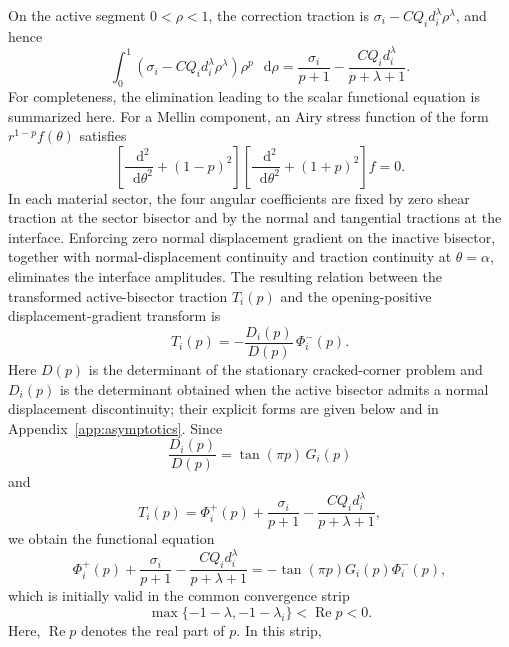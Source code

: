 \documentclass[pdflatex,onecolumn,sn-mathphys-ay]{sn-jnl}
\newcommand{\dd}{\mathop{}\!\mathrm{d}}
\begin{document}
On the active segment $0<\rho<1$, the correction traction is
$\sigma_i-CQ_i d_i^\lambda\rho^\lambda$, and hence
\begin{equation*}
  \int_0^1
  \left(\sigma_i-CQ_i d_i^\lambda\rho^\lambda\right)
  \rho^p\,\dd\rho
  =
  \frac{\sigma_i}{p+1}
  -\frac{CQ_i d_i^\lambda}{p+\lambda+1}.
\end{equation*}
For completeness, the elimination leading to the scalar functional
equation is summarized here. For a Mellin component, an Airy stress function
of the form $r^{1-p}f(\theta)$ satisfies
\begin{equation*}
  \left[\frac{\dd^2}{\dd\theta^2}+(1-p)^2\right]
  \left[\frac{\dd^2}{\dd\theta^2}+(1+p)^2\right]f=0.
\end{equation*}
In each material sector, the four angular coefficients are fixed by
zero shear traction at the sector bisector and by the normal and tangential
tractions at the interface. Enforcing zero normal displacement gradient on
the inactive bisector, together with normal-displacement continuity and
traction continuity at $\theta=\alpha$, eliminates the interface amplitudes. The
resulting relation between the transformed active-bisector traction
$T_i(p)$ and the opening-positive displacement-gradient transform is
\begin{equation*}
  T_i(p)=-\frac{D_i(p)}{D(p)}\,\Phi_i^-(p).
\end{equation*}
Here $D(p)$ is the determinant of the stationary cracked-corner problem and
$D_i(p)$ is the determinant obtained when the active bisector admits a
normal displacement discontinuity; their explicit forms are given below and
in Appendix~\ref{app:asymptotics}. Since
\begin{equation*}
  \frac{D_i(p)}{D(p)}=\tan(\pi p)\,G_i(p)
\end{equation*}
and
\begin{equation*}
  T_i(p)=
  \Phi_i^+(p)+\frac{\sigma_i}{p+1}
  -\frac{CQ_i d_i^\lambda}{p+\lambda+1},
\end{equation*}
we obtain the functional equation
\begin{equation}
\label{eq:wiener-hopf-functional}
  \Phi_i^+(p)
  +\frac{\sigma_i}{p+1}
  -\frac{CQ_i d_i^\lambda}{p+\lambda+1}
  =-\tan(\pi p)G_i(p)\Phi_i^-(p),
\end{equation}
which is initially valid in the common convergence strip
\begin{equation*}
  \max\{-1-\lambda,-1-\lambda_i\}
  <\operatorname{Re}p<0.
\end{equation*}
Here, $\operatorname{Re}p$ denotes the real part of $p$. In this strip,
\end{document}
